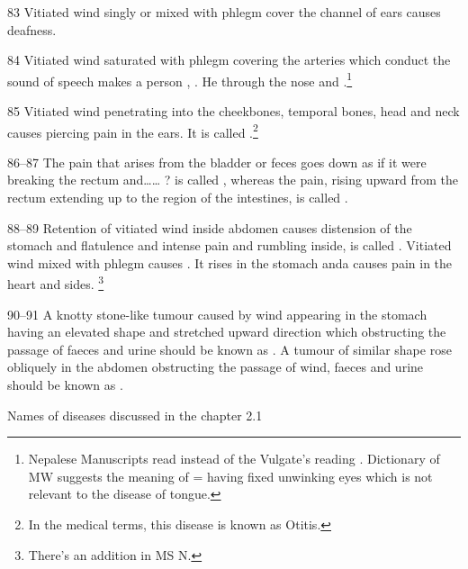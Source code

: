 \begin{translation}
\item[83] Vitiated wind singly or mixed with phlegm cover the channel of ears causes deafness.

\item[84] Vitiated wind saturated with phlegm covering the arteries which 
conduct the sound of speech makes a person , 
. He  through the nose and 
.\footnote{Nepalese Manuscripts read  
instead of the Vulgate’s reading . Dictionary of MW suggests the 
meaning of  = having fixed unwinking eyes which is not relevant to 
the disease of tongue.}

\item[85] Vitiated wind penetrating into the cheekbones, temporal bones, head 
and neck causes piercing pain in the ears. It is called 
.\footnote{In the medical terms, this disease is known 
as Otitis.}

\item[86--87] The pain that arises from the bladder or feces goes down as if it were breaking the rectum and…… ? is called , whereas the pain, rising upward from the rectum extending up to the region of the intestines, is called .

\item[88--89] Retention of vitiated wind inside abdomen causes distension of the 
stomach and flatulence and intense pain and rumbling inside, is called 
. Vitiated wind mixed with phlegm causes 
. It rises in the stomach anda causes pain in the heart and 
sides. \footnote{There’s an addition in MS N. }

\item[90--91] A knotty stone-like tumour caused by wind appearing in the stomach having an elevated shape and stretched upward direction which obstructing the passage of faeces and urine should be known as . A tumour of similar shape rose obliquely in the abdomen obstructing the passage of wind, faeces and urine should be known as . 


Names of diseases discussed in the chapter 2.1





\end{translation}
